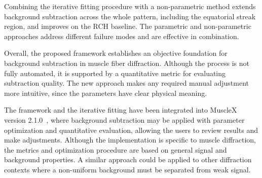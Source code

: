 \documentclass[journal,article,submit,moreauthors]{Definitions/mdpi}
\begin{document}
Combining the iterative fitting procedure with a non-parametric method extends background subtraction across the whole pattern, including the equatorial streak region, and improves on the RCH baseline. The parametric and non-parametric approaches address different failure modes and are effective in combination.

Overall, the proposed framework establishes an objective foundation for background subtraction in muscle fiber diffraction. Although the process is not fully automated, it is supported by a quantitative metric for evaluating subtraction quality. The new approach makes any required manual adjustment more intuitive, since the parameters have clear physical meaning.

The framework and the iterative fitting have been integrated into MuscleX version 2.1.0~\citep{lee2019musclex}, where background subtraction may be applied with parameter optimization and quantitative evaluation, allowing the users to review results and make adjustments. Although the implementation is specific to muscle diffraction, the metrics and optimization procedure are based on general signal and background properties. A similar approach could be applied to other diffraction contexts where a non-uniform background must be separated from weak signal.


\vspace{6pt} 



\end{document}
